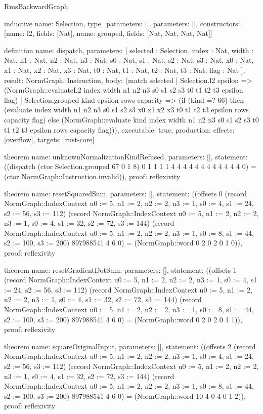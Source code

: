 \begin{lexlean}{RmsBackwardGraph}
\begin{semanticmodule}
inductive{
  name: Selection,
  type_parameters: [],
  parameters: [],
  constructors: [{name: l2, fields: [Nat]}, {name: grouped, fields: [Nat, Nat, Nat, Nat]}]
}

definition{
  name: dispatch,
  parameters: [
    selected : Selection,
    index : Nat,
    width : Nat,
    n1 : Nat,
    n2 : Nat,
    n3 : Nat,
    s0 : Nat,
    s1 : Nat,
    s2 : Nat,
    s3 : Nat,
    x0 : Nat,
    x1 : Nat,
    x2 : Nat,
    x3 : Nat,
    t0 : Nat,
    t1 : Nat,
    t2 : Nat,
    t3 : Nat,
    flag : Nat
  ],
  result: NormGraph::Instruction,
  body: (match selected
    | Selection.l2 epsilon => (NormGraph::evaluateL2 index width n1 n2 n3 s0 s1 s2 s3 t0 t1 t2 t3 epsilon flag)
    | Selection.grouped kind epsilon rows capacity => (if (kind =? 66) then (evaluate index width n1 n2 n3 s0 s1 s2 s3 x0 x1 x2 x3 t0 t1 t2 t3 epsilon rows capacity flag) else (NormGraph::evaluate kind index width n1 n2 n3 s0 s1 s2 s3 t0 t1 t2 t3 epsilon rows capacity flag))),
  executable: true,
  production: {effects: [overflow], targets: [rust-core]}
}

theorem{
  name: unknownNormalizationKindRefused,
  parameters: [],
  statement: ((dispatch (ctor Selection.grouped 67 0 1 8) 0 1 1 1 1 4 4 4 4 4 4 4 4 4 4 4 4 0) = (ctor NormGraph::Instruction.invalid)),
  proof: reflexivity{}
}

theorem{
  name: resetSquaredSum,
  parameters: [],
  statement: ((offsets 0 (record NormGraph::IndexContext {u0 := 5, n1 := 2, n2 := 2, n3 := 1, s0 := 4, s1 := 24, s2 := 56, s3 := 112}) (record NormGraph::IndexContext {u0 := 5, n1 := 2, n2 := 2, n3 := 1, s0 := 4, s1 := 32, s2 := 72, s3 := 144}) (record NormGraph::IndexContext {u0 := 5, n1 := 2, n2 := 2, n3 := 1, s0 := 8, s1 := 44, s2 := 100, s3 := 200}) 897988541 4 6 0) = (NormGraph::word 0 2 0 2 0 1 0)),
  proof: reflexivity{}
}

theorem{
  name: resetGradientDotSum,
  parameters: [],
  statement: ((offsets 1 (record NormGraph::IndexContext {u0 := 5, n1 := 2, n2 := 2, n3 := 1, s0 := 4, s1 := 24, s2 := 56, s3 := 112}) (record NormGraph::IndexContext {u0 := 5, n1 := 2, n2 := 2, n3 := 1, s0 := 4, s1 := 32, s2 := 72, s3 := 144}) (record NormGraph::IndexContext {u0 := 5, n1 := 2, n2 := 2, n3 := 1, s0 := 8, s1 := 44, s2 := 100, s3 := 200}) 897988541 4 6 0) = (NormGraph::word 0 2 0 2 0 1 1)),
  proof: reflexivity{}
}

theorem{
  name: squareOriginalInput,
  parameters: [],
  statement: ((offsets 2 (record NormGraph::IndexContext {u0 := 5, n1 := 2, n2 := 2, n3 := 1, s0 := 4, s1 := 24, s2 := 56, s3 := 112}) (record NormGraph::IndexContext {u0 := 5, n1 := 2, n2 := 2, n3 := 1, s0 := 4, s1 := 32, s2 := 72, s3 := 144}) (record NormGraph::IndexContext {u0 := 5, n1 := 2, n2 := 2, n3 := 1, s0 := 8, s1 := 44, s2 := 100, s3 := 200}) 897988541 4 6 0) = (NormGraph::word 10 4 0 4 0 1 2)),
  proof: reflexivity{}
}


\end{semanticmodule}
\end{lexlean}
